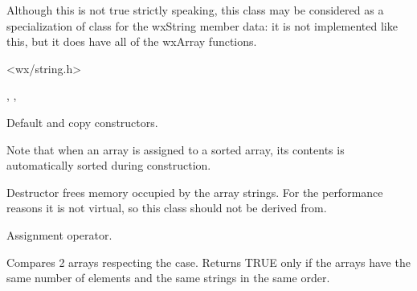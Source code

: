 
Although this is not true strictly speaking, this class may be considered as a
specialization of  class for the wxString member
data: it is not implemented like this, but it does have all of the wxArray
functions.


<wx/string.h>


, , 


\label{wxarraystringctor}



Default and copy constructors.

Note that when an array is assigned to a sorted array, its contents is
automatically sorted during construction.

\label{wxarraystringdtor}


Destructor frees memory occupied by the array strings. For the performance
reasons it is not virtual, so this class should not be derived from.

\label{wxarraystringoperatorassign}


Assignment operator.

\label{wxarraystringoperatorequal}


Compares 2 arrays respecting the case. Returns TRUE only if the arrays have
the same number of elements and the same strings in the same order.

\label{wxarraystringoperatornotequal}


